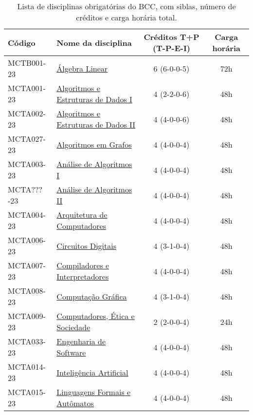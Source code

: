 \begin{table}[h!]
    \caption{Lista de disciplinas obrigatórias do BCC, com siblas, número de créditos e carga horária total.}
    \label{tab:disciplinas_obrigatorias_bcc}

    \centering
    \begin{tabular}{|l|p{}|c|c|}
        \hline
        \textbf{Código} & \textbf{Nome da disciplina} & \textbf{Créditos T+P (T-P-E-I)} & \textbf{Carga horária}\\
        \hline\hline
        MCTB001-23 & \hyperref[disc:alge_lin]{Álgebra Linear} & 6 (6-0-0-5) & 72h \\
        \hline
        MCTA001-23 & \hyperref[disc:aedI]{Algoritmos e Estruturas de Dados I} & 4 (2-2-0-6) & 48h \\
        \hline
        MCTA002-23 & \hyperref[disc:aedII]{Algoritmos e Estruturas de Dados II} & 4 (4-0-0-6) & 48h \\
        \hline
        MCTA027-23 & \hyperref[disc:ag]{Algoritmos em Grafos} & 4 (4-0-0-4) & 48h\\
        \hline
        MCTA003-23 & \hyperref[disc:aaI]{Análise de Algoritmos I} & 4 (4-0-0-4) & 48h \\
        \hline
        MCTA???-23 & \hyperref[disc:aaII]{Análise de Algoritmos II} & 4 (4-0-0-4) & 48h \\
        \hline
        MCTA004-23 & \hyperref[disc:arq]{Arquitetura de Computadores} & 4 (4-0-0-4) & 48h \\
        \hline
        MCTA006-23 & \hyperref[disc:circ_dig]{Circuitos Digitais} & 4 (3-1-0-4) & 48h \\
        \hline
        MCTA007-23 & \hyperref[disc:compi]{Compiladores e Interpretadores} & 4 (4-0-0-4) & 48h \\
        \hline
        MCTA008-23 & \hyperref[disc:cg]{Computação Gráfica} & 4 (3-1-0-4) & 48h  \\
        \hline
        MCTA009-23 & \hyperref[disc:ces]{Computadores, Ética e Sociedade} & 2 (2-0-0-4) & 24h \\
        \hline
        MCTA033-23 & \hyperref[disc:es]{Engenharia de Software} & 4 (4-0-0-4) & 48h \\
        \hline
        MCTA014-23 & \hyperref[disc:ia]{Inteligência Artificial} & 4 (4-0-0-4) & 48h \\
        \hline
        MCTA015-23 & \hyperref[disc:lfa]{Linguagens Formais e Autômatos} & 4 (4-0-0-4) & 48h \\
        \hline

\end{tabular}
\end{table}
